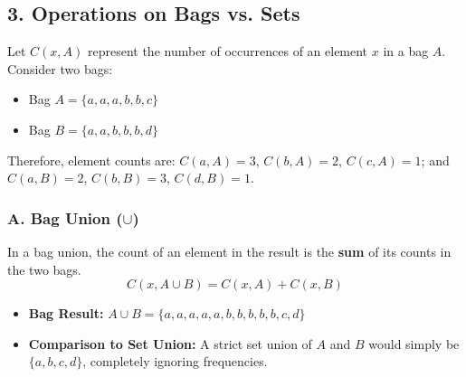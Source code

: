 \documentclass[12pt,a3paper]{article}
\begin{document}
\begin{enumerate}
\begin{tcolorbox}[enhanced,breakable,ansbox,colback=cA!4,colframe=cA,boxrule=0.8pt,arc=5pt,title={\textbf{Answer}},fonttitle=\bfseries\color{white},colbacktitle=cA]
\begin{center}
\end{center}
\vspace{1em}

\subsection*{3. Operations on Bags vs. Sets}

Let $C(x, A)$ represent the number of occurrences of an element $x$ in a bag $A$.
Consider two bags:
\begin{itemize}
    \item Bag $A = \{a, a, a, b, b, c\}$
    \item Bag $B = \{a, a, b, b, b, d\}$
\end{itemize}
Therefore, element counts are: 
$C(a, A) = 3$, $C(b, A) = 2$, $C(c, A) = 1$; and $C(a, B) = 2$, $C(b, B) = 3$, $C(d, B) = 1$.

\subsubsection*{A. Bag Union ($\cup$)}
In a bag union, the count of an element in the result is the \textbf{sum} of its counts in the two bags.
$$C(x, A \cup B) = C(x, A) + C(x, B)$$
\begin{itemize}
    \item \textbf{Bag Result:} $A \cup B = \{a, a, a, a, a, b, b, b, b, b, c, d\}$
    \item \textbf{Comparison to Set Union:} A strict set union of $A$ and $B$ would simply be $\{a, b, c, d\}$, completely ignoring frequencies.
\end{itemize}


\end{tcolorbox}
\end{enumerate}
\end{document}

